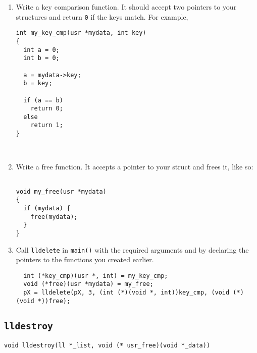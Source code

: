 \documentclass{article}
\begin{document}
\begin{enumerate}
\item Write a key comparison function. It should accept two pointers to your structures and return \texttt{0}
  if the keys match. For example,\\[8pt]
\begin{verbatim}
int my_key_cmp(usr *mydata, int key)
{
  int a = 0;
  int b = 0;
  
  a = mydata->key;
  b = key;
  
  if (a == b)
    return 0;
  else
    return 1;
}
\end{verbatim}
  
\vspace{5pt}

\\

\item Write a free function. It accepts a pointer to your struct and frees it, like so:\\[8pt]
\begin{verbatim}

void my_free(usr *mydata)
{
  if (mydata) {
    free(mydata);
  }
}
\end{verbatim}


\item Call \texttt{lldelete} in \texttt{main()} with the required arguments and by declaring the pointers to the
  functions you created earlier. \\[8pt]
\begin{verbatim}
  int (*key_cmp)(usr *, int) = my_key_cmp;
  void (*free)(usr *mydata) = my_free;
  pX = lldelete(pX, 3, (int (*)(void *, int))key_cmp, (void (*)(void *))free);
\end{verbatim}
\end{enumerate}

\subsection{\texttt{lldestroy}}
\label{lldestroy}

\verb|void lldestroy(ll *_list, void (* usr_free)(void *_data))|
\end{document}
